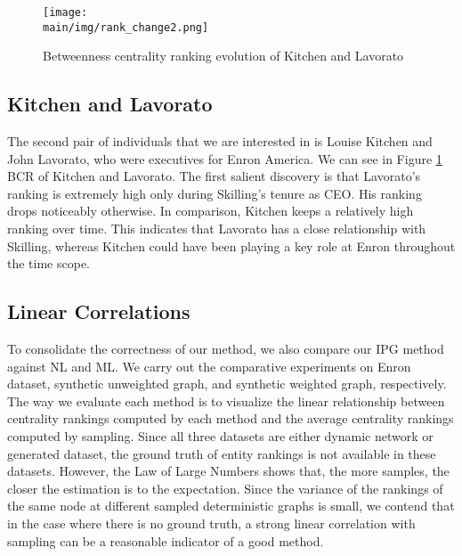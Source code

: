 \documentclass[\main/thesis.tex]{subfiles}
\begin{document}
\begin{figure}
\centering
\texttt{[image: \\main/img/rank\_change2.png]}
\caption{Betweenness centrality ranking evolution of Kitchen and Lavorato}
\label{rank_change2}
\end{figure}

\subsection*{Kitchen and Lavorato}
The second pair of individuals that we are interested in is Louise Kitchen and John Lavorato, who were executives for Enron America. We can see in Figure \ref{rank_change2} BCR of Kitchen and Lavorato. The first salient discovery is that Lavorato's ranking is extremely high only during Skilling's tenure as CEO. His ranking drops noticeably otherwise. In comparison, Kitchen keeps a relatively high ranking over time. This indicates that Lavorato has a close relationship with Skilling, whereas Kitchen could have been playing a key role at Enron throughout the time scope.

\subsection{Linear Correlations} \label{Linear-Correlations}
To consolidate the correctness of our method, we also compare our IPG method against NL and ML. We carry out the comparative experiments on Enron dataset, synthetic unweighted graph, and synthetic weighted graph, respectively. The way we evaluate each method is to visualize the linear relationship between centrality rankings computed by each method and the average centrality rankings computed by sampling. Since all three datasets are either dynamic network or generated dataset, the ground truth of entity rankings is not available in these datasets. However, the Law of Large Numbers shows that, the more samples, the closer the estimation is to the expectation. Since the variance of the rankings of the same node at different sampled deterministic graphs is small, we contend that in the case where there is no ground truth, a strong linear correlation with sampling can be a reasonable indicator of a good method. 
\end{document}
